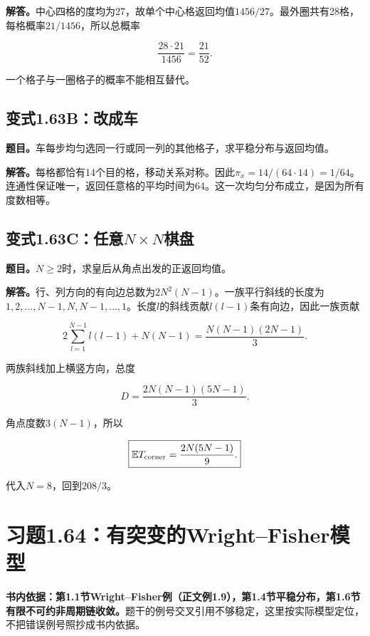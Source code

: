 \documentclass[
  11pt,a4paper,UTF8,fontset=fandol]{ctexart}
\begin{document}
\textbf{解答。}中心四格的度均为27，故单个中心格返回均值\(1456/27\)。最外圈共有28格，每格概率\(21/1456\)，所以总概率

\[\boxed{\frac{28\cdot21}{1456}=\frac{21}{52}.}\]

一个格子与一圈格子的概率不能相互替代。

\subsection{变式1.63B：改成车}\label{ux53d8ux5f0f1.63bux6539ux6210ux8f66}

\textbf{题目。}车每步均匀选同一行或同一列的其他格子，求平稳分布与返回均值。

\textbf{解答。}每格都恰有14个目的格，移动关系对称。因此\(\pi_x=14/(64\cdot14)=1/64\)。连通性保证唯一，返回任意格的平均时间为64。这一次均匀分布成立，是因为所有度数相等。

\subsection{\texorpdfstring{变式1.63C：任意\(N\times N\)棋盘}{变式1.63C：任意N\textbackslash times N棋盘}}\label{ux53d8ux5f0f1.63cux4efbux610fntimes-nux68cbux76d8}

\textbf{题目。}\(N\ge2\)时，求皇后从角点出发的正返回均值。

\textbf{解答。}行、列方向的有向边总数为\(2N^2(N-1)\)。一族平行斜线的长度为\(1,2,\ldots,N-1,N,N-1,\ldots,1\)。长度\(l\)的斜线贡献\(l(l-1)\)条有向边，因此一族贡献

\[2\sum_{l=1}^{N-1}l(l-1)+N(N-1)=\frac{N(N-1)(2N-1)}3.\]

两族斜线加上横竖方向，总度

\[D=\frac{2N(N-1)(5N-1)}3.\]

角点度数\(3(N-1)\)，所以

\[\boxed{\mathbb E T_{\rm corner}=\frac{2N(5N-1)}9.}\]

代入\(N=8\)，回到\(208/3\)。

\section{习题1.64：有突变的Wright--Fisher模型}\label{ux4e60ux98981.64ux6709ux7a81ux53d8ux7684wrightfisherux6a21ux578b}

\textbf{书内依据：第1.1节Wright--Fisher例（正文例1.9），第1.4节平稳分布，第1.6节有限不可约非周期链收敛。}题干的例号交叉引用不够稳定，这里按实际模型定位，不把错误例号照抄成书内依据。
\end{document}
